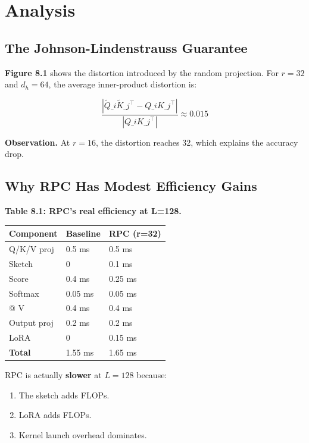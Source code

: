 
\section{Analysis}

\subsection{The Johnson-Lindenstrauss Guarantee}

\textbf{Figure 8.1} shows the distortion introduced by the random projection. 
For $r = 32$ and $d_h = 64$, the average inner-product distortion is:

\[
\frac{|\tilde{Q}\_i \tilde{K}\_j^\top - Q\_i K\_j^\top|}{|Q\_i K\_j^\top|} \approx 0.015
\]

\textbf{Observation.} At $r = 16$, the distortion reaches 32, 
which explains the accuracy drop.

\subsection{Why RPC Has Modest Efficiency Gains}

\textbf{Table 8.1: RPC's real efficiency at L=128.}

\begin{table}[H]
\centering
\small
\begin{tabular}{lll}
\toprule
\textbf{Component} & \textbf{Baseline} & \textbf{RPC (r=32)} \\
\midrule
Q/K/V proj & 0.5 ms & 0.5 ms \\
Sketch & 0 & 0.1 ms \\
Score & 0.4 ms & 0.25 ms \\
Softmax & 0.05 ms & 0.05 ms \\
@ V & 0.4 ms & 0.4 ms \\
Output proj & 0.2 ms & 0.2 ms \\
LoRA & 0 & 0.15 ms \\
\textbf{Total} & 1.55 ms & 1.65 ms \\
\bottomrule
\end{tabular}
\end{table}

RPC is actually \textbf{slower} at $L = 128$ because:
\begin{enumerate}
\item The sketch adds FLOPs.
\item LoRA adds FLOPs.
\item Kernel launch overhead dominates.

\end{enumerate}
